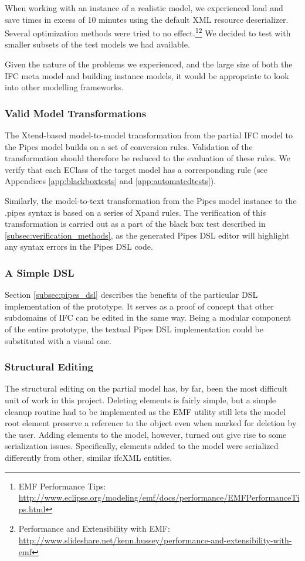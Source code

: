 When working with an instance of a realistic model, we experienced load and save times in excess of 10 minutes using the default XML resource deserializer. Several optimization methods were tried to no effect.\footnote{EMF Performance Tips: \url{http://www.eclipse.org/modeling/emf/docs/performance/EMFPerformanceTips.html}}\footnote{Performance and Extensibility with EMF: \url{http://www.slideshare.net/kenn.hussey/performance-and-extensibility-with-emf}} We decided to test with smaller subsets of the test models we had available.

Given the nature of the problems we experienced, and the large size of both the IFC meta model and building instance models, it would be appropriate to look into other modelling frameworks.

\subsubsection{Valid Model Transformations} The Xtend-based model-to-model transformation from the partial IFC model to the Pipes model builds on a set of conversion rules. Validation of the transformation should therefore be reduced to the evaluation of these rules. We verify that each EClass of the target model has a corresponding rule (see Appendices \ref{app:blackboxtests} and \ref{app:automatedtests}).

Similarly, the model-to-text transformation from the Pipes model instance to the .pipes syntax is based on a series of Xpand rules. The verification of this transformation is carried out as a part of the black box test described in \ref{subsec:verification_methods}, as the generated Pipes DSL editor will highlight any syntax errors in the Pipes DSL code.

\subsubsection{A Simple DSL} Section \ref{subsec:pipes_dsl} describes the benefits of the particular DSL implementation of the prototype. It serves as a proof of concept that other subdomains of IFC can be edited in the same way. Being a modular component of the entire prototype, the textual Pipes DSL implementation could be substituted with a visual one.

\subsubsection{Structural Editing} The structural editing on the partial model has, by far, been the most difficult unit of work in this project. Deleting elements is fairly simple, but a simple cleanup routine had to be implemented as the EMF utility still lets the model root element preserve a reference to the object even when marked for deletion by the user. Adding elements to the model, however, turned out give rise to some serialization issues. Specifically, elements added to the model were serialized differently from other, similar ifcXML entities.

